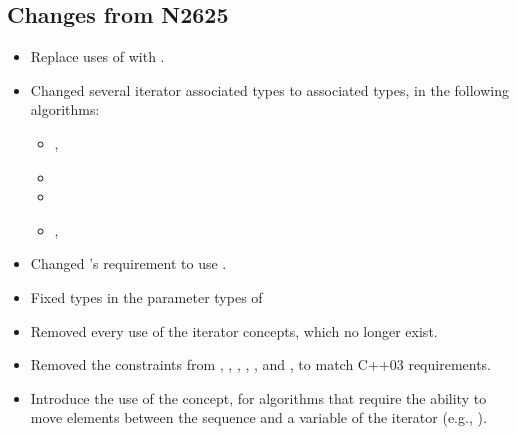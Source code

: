 \documentclass[american,twoside]{book}
\begin{document}
\begin{titlepage}
\section*{Changes from N2625}
\begin{itemize}
\item Replace uses of  with .
\item Changed several iterator  associated types to  associated types, in the following algorithms:
  \begin{itemize}
  \item {}, 
  \item {}
  \item {}
  \item {}, 
  \end{itemize}
\item Changed 's  requirement
  to use . 
\item Fixed types in the parameter types of 
\item Removed every use of the  iterator concepts, which no longer exist.
\item Removed the  constraints from ,
  , , ,
  , and , to
  match C++03 requirements.
\item Introduce the use of the  concept, for
  algorithms that require the ability to move elements between the
  sequence and a variable of the iterator  (e.g.,
  ).
\end{itemize}

\end{titlepage}

\pagestyle{fancy}
\fancyhead[LE,RO]{\textbf{\rightmark}}
\fancyhead[RE]{\textbf{\leftmark\hspace{1em}\thepage}}
\fancyhead[LO]{\textbf{\thepage\hspace{1em}\leftmark}}

\end{document}
